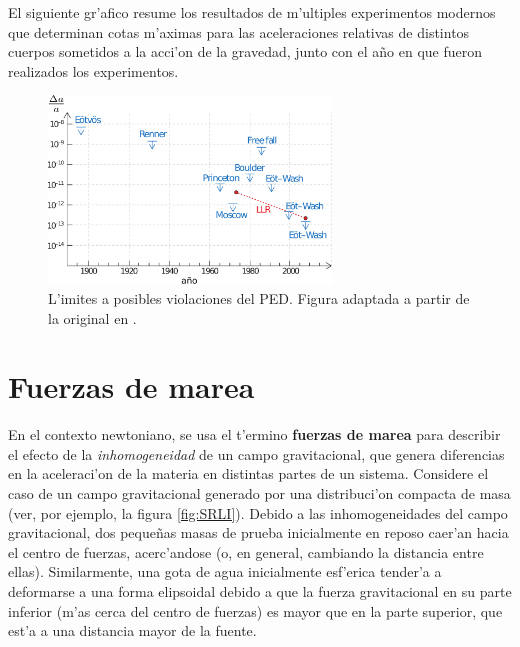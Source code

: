 El siguiente gr'afico resume los resultados de m'ultiples experimentos modernos que determinan cotas m'aximas para las aceleraciones relativas de distintos cuerpos sometidos a la acci'on de la gravedad, junto con el a\~no en que fueron realizados los experimentos.
\begin{center}
\begin{figure}[H]
\centerline{\includegraphics[height=5cm]{fig/fig-tests-PED.pdf}}
\caption{L'imites a posibles violaciones del PED. Figura adaptada a partir de la original en \cite{Turyshev08}.}
\label{fig:equiv1}
\end{figure}
\end{center}

\section{Fuerzas de marea}
En el contexto newtoniano, se usa el t'ermino \textbf{fuerzas de marea} para describir el efecto de la \textit{inhomogeneidad} de un campo gravitacional, que genera diferencias en la aceleraci'on de la materia en distintas partes de un sistema. Considere el caso de un campo gravitacional generado por una distribuci'on compacta de masa (ver, por ejemplo, la figura \ref{fig:SRLI}). Debido a las inhomogeneidades del campo gravitacional, dos peque\~nas masas de prueba inicialmente en reposo caer'an hacia el centro de fuerzas, acerc'andose (o, en general, cambiando la distancia entre ellas). Similarmente, una gota de agua inicialmente esf'erica tender'a a deformarse a una forma elipsoidal debido a que la fuerza gravitacional en su parte inferior (m'as cerca del centro de fuerzas) es mayor que en la parte superior, que est'a a una distancia mayor de la fuente.

